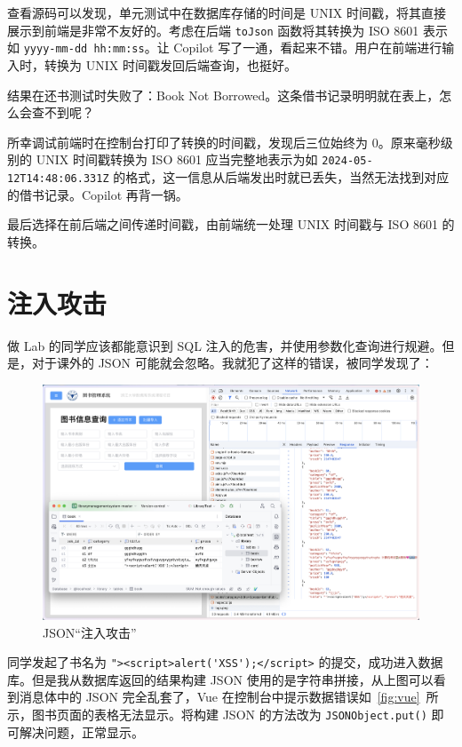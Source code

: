 \documentclass[a4paper,oneside]{ctexbook}
\begin{document}
查看源码可以发现，单元测试中在数据库存储的时间是 UNIX 时间戳，将其直接展示到前端是非常不友好的。考虑在后端 \verb|toJson| 函数将其转换为 ISO 8601 表示如 \verb|yyyy-mm-dd hh:mm:ss|。让 Copilot 写了一通，看起来不错。用户在前端进行输入时，转换为 UNIX 时间戳发回后端查询，也挺好。

结果在还书测试时失败了：Book Not Borrowed。这条借书记录明明就在表上，怎么会查不到呢？

所幸调试前端时在控制台打印了转换的时间戳，发现后三位始终为 0。原来毫秒级别的 UNIX 时间戳转换为 ISO 8601 应当完整地表示为如 \verb|2024-05-12T14:48:06.331Z| 的格式，这一信息从后端发出时就已丢失，当然无法找到对应的借书记录。Copilot 再背一锅。

最后选择在前后端之间传递时间戳，由前端统一处理 UNIX 时间戳与 ISO 8601 的转换。

\section{注入攻击}

做 Lab 的同学应该都能意识到 SQL 注入的危害，并使用参数化查询进行规避。但是，对于课外的 JSON 可能就会忽略。我就犯了这样的错误，被同学发现了：

\begin{figure}[!h]
    \centering
    \includegraphics[width=\textwidth]{src/attack-json.png}
    \caption{JSON“注入攻击”}
    \label{fig:json-attack}
\end{figure}

同学发起了书名为 \verb|"><script>alert('XSS');</script>| 的提交，成功进入数据库。但是我从数据库返回的结果构建 JSON 使用的是字符串拼接，从上图可以看到消息体中的 JSON 完全乱套了，Vue 在控制台中提示数据错误如~\ref{fig:vue}~所示，图书页面的表格无法显示。将构建 JSON 的方法改为 \verb|JSONObject.put()| 即可解决问题，正常显示。
\end{document}
